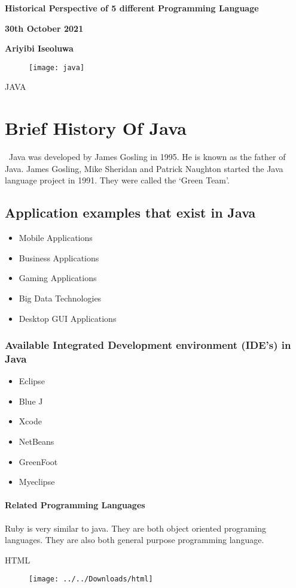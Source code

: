 \documentclass{article}
\begin{document}
 
 	\textbf{Historical Perspective of 5 different Programming Language}
 \begin{center}
 		\textbf{30th October 2021}
 	
 	\textbf{Ariyibi Iseoluwa}
 \end{center}
\newpage
	\centering
		\begin{figure}[h]
			\texttt{[image: java]}
			\centering
		\end{figure}
		JAVA	
	\section{Brief History Of Java}

	\ Java was developed by James Gosling in 1995. He is known as the father of Java. James Gosling, Mike Sheridan and Patrick Naughton started the Java language project in 1991. They were called the ‘Green Team’.
	\subsection{Application examples that exist in Java}
	\begin{itemize}
		\item Mobile Applications
		\item Business Applications
		\item Gaming Applications
		\item Big Data Technologies
		\item Desktop GUI Applications
	\end{itemize}
\subsubsection{Available Integrated Development environment (IDE’s) in Java}
\begin{itemize}
	\item Eclipse
	\item Blue J
	\item Xcode
	\item NetBeans
	\item GreenFoot
	\item Myeclipse
\end{itemize}
\paragraph*{Related Programming Languages}
Ruby is very similar to java. They are both object oriented programing languages. They are also both general purpose programming language. 
\newpage
\begin{center}
	HTML
	\begin{figure}[h]
		\texttt{[image: ../../Downloads/html]}
		\label{fig:html}
	\end{figure}
\end{center}
\end{document}
